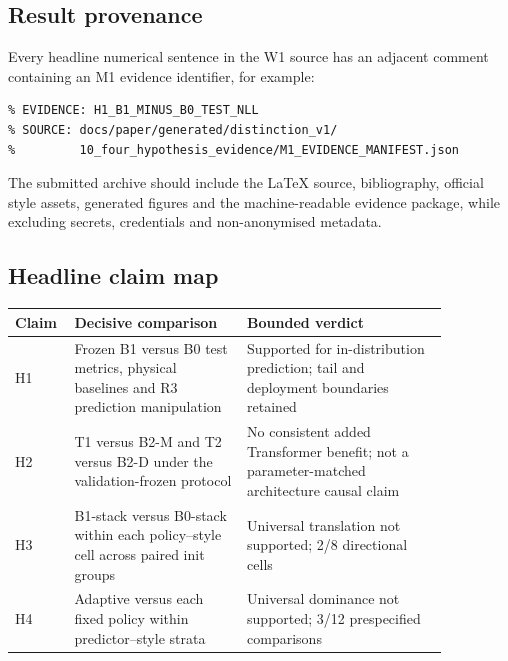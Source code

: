 \subsection{Result provenance}

Every headline numerical sentence in the W1 source has an adjacent
comment containing an M1 evidence identifier, for example:

\begin{verbatim}
% EVIDENCE: H1_B1_MINUS_B0_TEST_NLL
% SOURCE: docs/paper/generated/distinction_v1/
%         10_four_hypothesis_evidence/M1_EVIDENCE_MANIFEST.json
\end{verbatim}

The submitted archive should include the LaTeX source, bibliography, official
style assets, generated figures and the machine-readable evidence package,
while excluding secrets, credentials and non-anonymised metadata.

\subsection{Headline claim map}

\begin{center}
\small
\begin{tabular}{@{}L{0.08\linewidth}L{0.36\linewidth}L{0.42\linewidth}@{}}
\toprule
Claim & Decisive comparison & Bounded verdict \\
\midrule
H1 & Frozen B1 versus B0 test metrics, physical baselines and R3 prediction
manipulation & Supported for in-distribution prediction; tail and deployment
boundaries retained \\
H2 & T1 versus B2-M and T2 versus B2-D under the validation-frozen protocol &
No consistent added Transformer benefit; not a parameter-matched architecture
causal claim \\
H3 & B1-stack versus B0-stack within each policy--style cell across paired
init groups & Universal translation not supported; 2/8 directional cells \\
H4 & Adaptive versus each fixed policy within predictor--style strata &
Universal dominance not supported; 3/12 prespecified comparisons \\
\bottomrule
\end{tabular}
\end{center}

